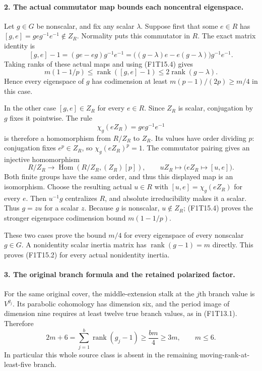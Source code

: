 \paragraph{2. The actual commutator map bounds each noncentral eigenspace.}
Let $g\in G$ be nonscalar, and fix any scalar $\lambda$.
Suppose first that some $e\in R$ has
$[g,e]=geg^{-1}e^{-1}\notin Z_R$.
Normality puts this commutator in $R$. The exact matrix identity is
\[
 [g,e]-1=(ge-eg)g^{-1}e^{-1}
       =\bigl((g-\lambda)e-e(g-\lambda)\bigr)g^{-1}e^{-1}.
 \tag{F1T15.5}
\]
Taking ranks of these actual maps and using (F1T15.4) gives
\[
 m(1-1/p)\le\operatorname{rank}([g,e]-1)
                    \le2\operatorname{rank}(g-\lambda).
 \tag{F1T15.6}
\]
Hence every eigenspace of $g$ has codimension at least
$m(p-1)/(2p)\ge m/4$ in this case.

In the other case $[g,e]\in Z_R$ for every $e\in R$.
Since $Z_R$ is scalar, conjugation by $g$ fixes it pointwise.
The rule
\[
 \chi_g(eZ_R)=geg^{-1}e^{-1}
 \tag{F1T15.7}
\]
is therefore a homomorphism from $R/Z_R$ to $Z_R$.
Its values have order dividing $p$: conjugation fixes $e^p\in Z_R$,
so $\chi_g(eZ_R)^p=1$. The commutator pairing gives an injective
homomorphism
\[
 R/Z_R\longrightarrow\operatorname{Hom}(R/Z_R,(Z_R)[p]),
       \qquad uZ_R\longmapsto\bigl(eZ_R\mapsto[u,e]\bigr).
 \tag{F1T15.8}
\]
Both finite groups have the same order, and thus this displayed
map is an isomorphism. Choose the resulting actual $u\in R$
with $[u,e]=\chi_g(eZ_R)$ for every $e$.
Then $u^{-1}g$ centralizes $R$, and absolute irreducibility
makes it a scalar. Thus $g=zu$ for a scalar $z$.
Because $g$ is nonscalar, $u\notin Z_R$; (F1T15.4) proves
the stronger eigenspace codimension bound $m(1-1/p)$.

These two cases prove the bound $m/4$ for every eigenspace
of every nonscalar $g\in G$. A nonidentity scalar inertia
matrix has $\operatorname{rank}(g-1)=m$ directly.
This proves (F1T15.2) for every actual nonidentity inertia.

\paragraph{3. The original branch formula and the retained polarized factor.}
For the same original cover, the middle-extension stalk at the
$j$th branch value is $V^{g_j}$. Its parabolic cohomology has
dimension six, and the period image of dimension nine requires
at least twelve true branch values, as in (F1T13.1). Therefore
\[
       2m+6=\sum_{j=1}^b\operatorname{rank}(g_j-1)
                    \ge\frac{bm}{4}\ge3m,
                  \qquad m\le6.
 \tag{F1T15.9}
\]
In particular this whole source class is absent in the remaining
moving-rank-at-least-five branch.


